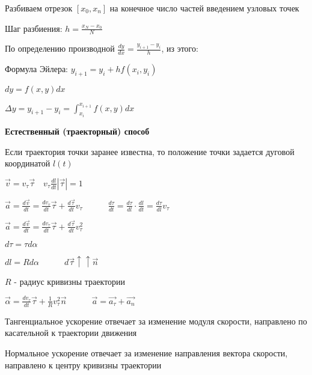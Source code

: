 \documentclass[12pt]{article}
\begin{document}
    Разбиваем отрезок $[x_0, x_n]$ на конечное число частей введением узловых точек

    Шаг разбиения: $h = \frac{x_N - x_0}{N}$

    По определению производной $\frac{dy}{dx} = \frac{y_{i + 1} - y_i}{h}$, из этого:

    \begin{tcolorbox}
        Формула Эйлера: $y_{i + 1} = y_i + hf(x_i, y_i)$
    \end{tcolorbox}

    $dy = f(x, y) dx$

    $\Delta y = y_{i + 1} - y_i = \int_{x_i}^{x_{i + 1}} f(x, y) dx$

    \textbf{Естественный (траекторный) способ}

    Если траектория точки заранее известна, то положение точки задается дуговой координатой $l(t)$

    $\vec{v} = v_\tau \vec{\tau} \quad v_\tau \frac{dl}{dt} |\vec{\tau}| = 1$

    $\vec{a} = \frac{d\vec{v}}{dt} = \frac{dv_\tau}{dt} \vec{\tau} + \frac{d\vec{\tau}}{dt} v_\tau \quad\quad\quad \frac{d\tau}{dt} = \frac{d\tau}{dl} \cdot \frac{dl}{dt} = \frac{d\tau}{dl} v_\tau$

    $\vec{a} = \frac{d\vec{v}}{dt} = \frac{dv_\tau}{dt} \vec{\tau} + \frac{d\vec{\tau}}{dt} v_\tau^2 $

    $d\tau = \tau d\alpha$

    $dl = R d\alpha \quad\quad\quad d\vec{\tau} \uparrow\uparrow \vec{n}$

    $R$ - радиус кривизны траектории

    $\vec{\alpha} = \frac{dv_\tau}{dt} \vec{\tau} + \frac{1}{R} v_\tau^2 \vec{n} \quad\quad\quad \vec{a} = \vec{a_\tau} + \vec{a_n}$

    Тангенциальное ускорение отвечает за изменение модуля скорости, направлено по касательной к траектории движения

    Нормальное ускорение отвечает за изменение направления вектора скорости, направлено к центру кривизны траектории
\end{document}

